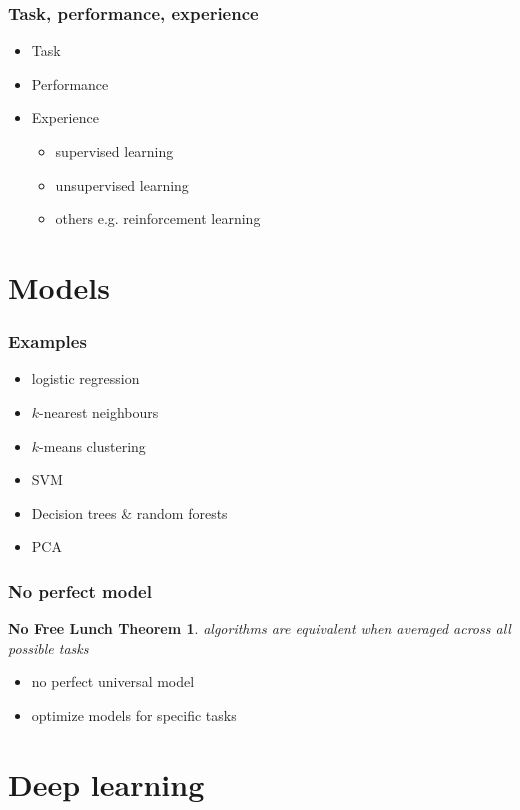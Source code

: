 \documentclass[xcolor={dvipsnames}]{beamer}
\newtheorem{nofreelunch}{No Free Lunch Theorem}
\begin{document}
\begin{frame}
  \frametitle{Task, performance, experience}
  \begin{itemize}
    \item<+-> Task
    \item<+-> Performance
    \item<+-> Experience
      \begin{itemize}
        \item supervised learning
        \item unsupervised learning
        \item others e.g. reinforcement learning
      \end{itemize}
  \end{itemize}
\end{frame}

\section{Models}

\begin{frame}
  \frametitle{Examples}
  \begin{itemize}
    \item<+-> logistic regression
    \item<+-> $k$-nearest neighbours
    \item<+-> $k$-means clustering
    \item<+-> SVM
    \item<+-> Decision trees \& random forests
    \item<+-> PCA
  \end{itemize}
\end{frame}

\begin{frame}
  \frametitle{No perfect model}
  \begin{nofreelunch}
    algorithms are equivalent when averaged across all possible tasks
  \end{nofreelunch}
  \begin{itemize}
    \item no perfect universal model
    \item optimize models for specific tasks
  \end{itemize}
\end{frame}

\section{Deep learning}
\end{document}
